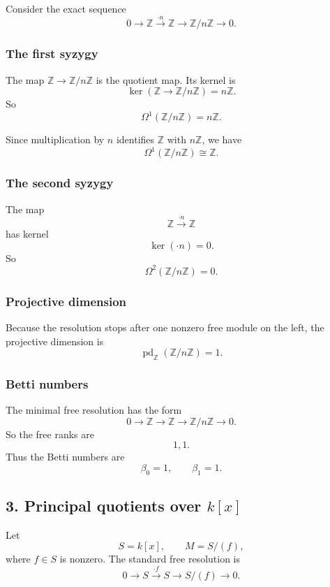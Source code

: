 \documentclass[12pt,a4paper]{article}
\theoremstyle{notespace}
\theoremstyle{definition}
\begin{document}
Consider the exact sequence
\[
0 \longrightarrow \mathbb Z \xrightarrow{\cdot n} \mathbb Z \longrightarrow \mathbb Z/n\mathbb Z \longrightarrow 0.
\]

\subsubsection*{The first syzygy}

The map \(\mathbb Z \to \mathbb Z/n\mathbb Z\) is the quotient map.
Its kernel is
\[
\ker(\mathbb Z \to \mathbb Z/n\mathbb Z)=n\mathbb Z.
\]
So
\[
\Omega^1(\mathbb Z/n\mathbb Z)=n\mathbb Z.
\]

Since multiplication by \(n\) identifies \(\mathbb Z\) with \(n\mathbb Z\), we have
\[
\Omega^1(\mathbb Z/n\mathbb Z)\cong \mathbb Z.
\]

\subsubsection*{The second syzygy}

The map
\[
\mathbb Z \xrightarrow{\cdot n} \mathbb Z
\]
has kernel
\[
\ker(\cdot n)=0.
\]
So
\[
\Omega^2(\mathbb Z/n\mathbb Z)=0.
\]

\subsubsection*{Projective dimension}

Because the resolution stops after one nonzero free module on the left, the projective dimension is
\[
\operatorname{pd}_{\mathbb Z}(\mathbb Z/n\mathbb Z)=1.
\]

\subsubsection*{Betti numbers}

The minimal free resolution has the form
\[
0 \longrightarrow \mathbb Z \longrightarrow \mathbb Z \longrightarrow \mathbb Z/n\mathbb Z \longrightarrow 0.
\]
So the free ranks are
\[
1,1.
\]
Thus the Betti numbers are
\[
\beta_0=1,\qquad \beta_1=1.
\]

\subsection{3. Principal quotients over \(k[x]\)}

Let
\[
S=k[x], \qquad M=S/(f),
\]
where \(f\in S\) is nonzero.
The standard free resolution is
\[
0 \longrightarrow S \xrightarrow{\cdot f} S \longrightarrow S/(f) \longrightarrow 0.
\]
\end{document}
